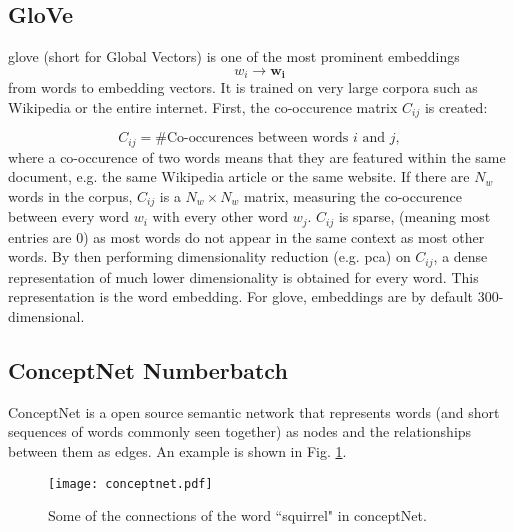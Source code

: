     \subsection{GloVe \label{ssec: Glove}}
        \gls{glove}\cite{glove} (short for Global Vectors) is one of the most prominent \glspl{embedding}
        \[ w_i \rightarrow \mathbf{w_i}\]
        from words to \gls{embedding} vectors. It is trained on very large corpora such as Wikipedia or the entire internet. First, the co-occurence matrix $C_{ij}$ is created:

        \begin{equation}
        C_{ij} = \text{\# Co-occurences between words $i$ and $j$},
        \end{equation}
        where a co-occurence of two words means that they are featured within the same document, e.g. the same Wikipedia article or the same website. If there are $N_w$ words in the corpus, $C_{ij}$ is a $N_w \times N_w$ matrix, measuring the co-occurence between every word $w_i$ with every other word $w_j$.
        $C_{ij}$ is sparse, (meaning most entries are 0) as most words do not appear in the same context as most other words. By then performing dimensionality reduction (e.g. \gls{pca}\cite{pcaPaper}) on $C_{ij}$, a dense representation of much lower dimensionality is obtained for every word. This representation is the word \gls{embedding}. For \gls{glove}, \glspl{embedding} are by default 300-dimensional\cite{glove}.


    \subsection{ConceptNet Numberbatch \label{ssec: Numberbatch}}

        ConceptNet\cite{conceptnet} is a open source semantic network that represents words (and short sequences of words commonly seen together) as nodes and the relationships between them as edges. An example is shown in Fig. \ref{fig: conceptnet}.
           \begin{figure}[h]
                \centering
                 \captionsetup{format=hang}
                \texttt{[image: conceptnet.pdf]}
                \caption{Some of the connections of the word ``squirrel" in conceptNet. \label{fig: conceptnet}}
            \end{figure}

